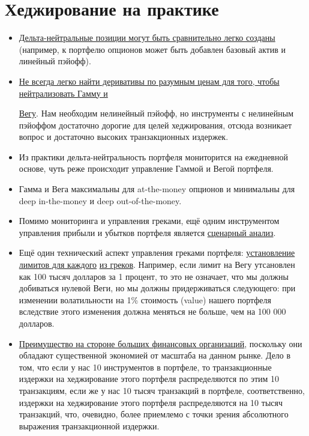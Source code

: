 \documentclass{article}
\begin{document}
\section{Хеджирование на практике}
 \begin{itemize}
 	
\item \underline{Дельта-нейтральные позиции могут быть сравнительно легко созданы} (например, к портфелю опционов может быть добавлен базовый актив и линейный пэйофф).


\item \underline{Не всегда легко найти деривативы по разумным ценам для того, чтобы нейтрализовать Гамму и}

\underline{Вегу}. Нам необходим нелинейный пэйофф, но инструменты с нелинейным пэйоффом достаточно дорогие для целей хеджирования, отсюда возникает вопрос и достаточно высоких транзакционных издержек.

\item Из практики дельта-нейтральность портфеля мониторится на ежедневной основе, чуть реже происходит управление Гаммой и Вегой портфеля.

\item Гамма и Вега максимальны для at-the-money опционов и минимальны для
deep in-the-money и deep out-of-the-money. 


\item Помимо мониторинга и управления греками, ещё одним инструментом управления прибыли и убытков портфеля является \underline{сценарный анализ}.


\item Ещё один технический аспект управления греками портфеля: \underline{установление лимитов для каждого} \underline{из греков}. Например, если лимит на Вегу утсановлен как 100 тысяч долларов за 1 процент, то это не означает, что мы должны добиваться нулевой Веги, но мы должны придерживаться следующего: при изменении волатильности на 1\% стоимость (value) нашего портфеля вследствие этого изменения должна меняться не больше, чем на 100 000 долларов.

\item \underline{Преимущество на стороне больших финансовых организаций}, поскольку они обладают существенной экономией от масштаба на данном рынке. Дело в том, что если у нас 10 инструментов в портфеле, то транзакционные издержки на хеджирование этого портфеля распределяются по этим 10 транзакциям, если же у нас 10 тысяч транзакций в портфеле, соответственно, издержки на хеджирование этого портфеля распределяются на 10 тысяч транзакций, что, очевидно, более приемлемо с точки зрения абсолютного выражения транзакционной издержки.


\end{itemize}
\end{document}
